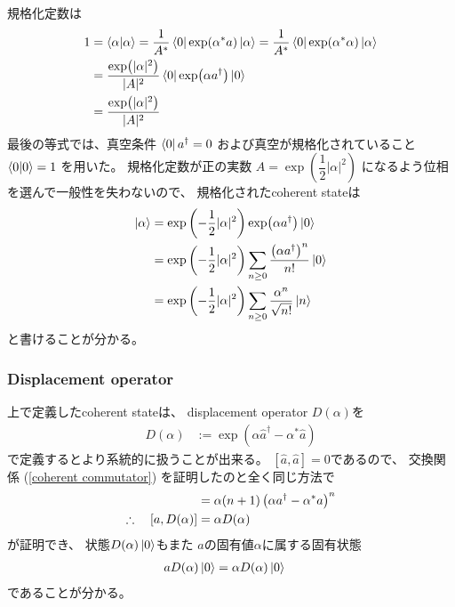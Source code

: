 規格化定数は
\begin{align}
    1
    &=
    \braket{ \alpha | \alpha }
    =
    \dfrac{1}{A^*}
    \bra{0}
    \exp(\alpha^* a)
    \ket{\alpha}
    =
    \dfrac{1}{A^*}
    \bra{0}
    \exp(\alpha^* \alpha)
    \ket{\alpha}
\notag\\&=
    \dfrac{
        \exp( |\alpha|^2 )
    }{|A|^2}
    \bra{0}
    \exp(\alpha a^\dagger)
    \ket{0}
\notag\\&=
    \dfrac{
        \exp( |\alpha|^2 )
    }{|A|^2}
\end{align}
最後の等式では、真空条件
$\bra{0}a^\dagger = 0$
および真空が規格化されていること
$\braket{0|0}=1$
を用いた。
規格化定数が正の実数
$A = \exp\left( \dfrac{1}{2} |\alpha|^2 \right)$
になるよう位相を選んで一般性を失わないので、
規格化されたcoherent stateは
\begin{align}
    \ket{\alpha}
    &=
    \exp\left( -\dfrac{1}{2} |\alpha|^2 \right)
    \exp(\alpha a^\dagger)
    \ket{0}
\notag\\&=
    \exp\left( -\dfrac{1}{2} |\alpha|^2 \right)
    \sum_{n\ge0}
    \dfrac{
        \left(\alpha a^\dagger\right)^n
    }{n!}
    \ket{0}
\notag\\&=
    \exp\left( -\dfrac{1}{2} |\alpha|^2 \right)
    \sum_{n\ge0}
    \dfrac{\alpha^n}{\sqrt{n!}}
    \ket{n}
\end{align}
と書けることが分かる。

\subsubsection{Displacement operator}

上で定義したcoherent stateは、
displacement operator $D(\alpha)$を
\begin{align}
    D(\alpha) &:=
   \exp(
        \alpha\hat{a}^\dagger
        - \alpha^* \hat{a}
    )
\end{align}
で定義するとより系統的に扱うことが出来る。
$[\hat{a}, \hat{a}]=0$であるので、
交換関係
(\ref{coherent commutator})
を証明したのと全く同じ方法で
\begin{align}
    [\hat{a},\left(
        \alpha\hat{a}^\dagger
        - \alpha^* \hat{a}
    \right)^{n+1}]
    &=
    \alpha
    (n+1) \left(
        \alpha\hat{a}^\dagger
        - \alpha^* \hat{a}
    \right)^{n}
\notag\\\therefore\quad
    [\hat{a}, D(\alpha) ]
    &=
    \alpha D(\alpha)
\end{align}
が証明でき、
状態$D(\alpha)\ket{0}$もまた
$\hat{a}$の固有値$\alpha$に属する固有状態
\begin{align}
    a D(\alpha)\ket{0}
    &=
    \alpha D(\alpha)\ket{0}
\end{align}
であることが分かる。

